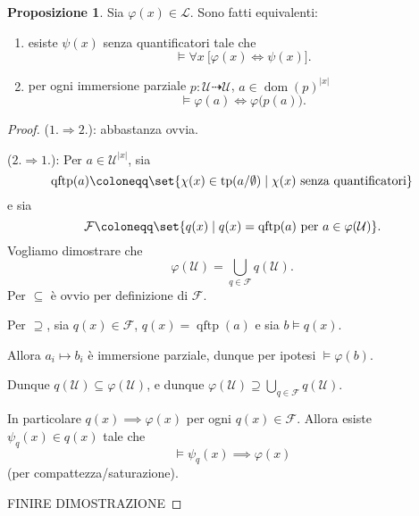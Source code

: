 \documentclass[10pt]{article}
\newcommand{\1}{\mathds{1}}
\newcommand{\partialto}{\dashrightarrow}
\theoremstyle{definition}%
\newtheorem{prop}[thm]{Proposizione}
\theoremstyle{plain}
\theoremstyle{remark}
\begin{document}
\begin{prop}
Sia \(\varphi(x) \in \mathcal{L}\). Sono fatti equivalenti:
\begin{enumerate}
\item esiste \(\psi(x)\) senza quantificatori tale che
\begin{equation*}
 \vDash \forall x\ \big[\varphi(x)\iff\psi(x)\big].
\end{equation*}
\item per ogni immersione parziale \(p:\mathcal{U}\partialto\mathcal{U}\), \(a \in \operatorname{dom}(p)^{|x|}\)
\begin{equation*}
 \vDash \varphi(a)\iff\varphi\big(p(a)\big).
\end{equation*}
\end{enumerate}
\end{prop}
\begin{proof}
(\(1.\Rightarrow 2.\)): abbastanza ovvia.

(\(2.\Rightarrow 1.\)): Per \(a \in \mathcal{U}^{|x|}\), sia
\begin{equation*}
\operatorname{qftp}(a) \coloneqq \set{\chi(x) \in \operatorname{tp}(a/\emptyset)\mid \chi(x)\text{ senza quantificatori}}
\end{equation*}
e sia
\begin{equation*}
\mathcal{F}\coloneqq\set{q(x)\mid q(x)=\operatorname{qftp}(a)\text{ per }a \in \varphi(\mathcal{U})}.
\end{equation*}
Vogliamo dimostrare che
\begin{equation*}
\varphi(\mathcal{U}) = \bigcup_{q \in \mathcal{F}}q(\mathcal{U}).
\end{equation*}
Per \(\subseteq\) è ovvio per definizione di \(\mathcal{F}\).

Per \(\supseteq\), sia \(q(x) \in \mathcal{F}\), \(q(x)=\operatorname{qftp}(a)\) e sia \(b\vDash q(x)\).

Allora \(a_{i}\mapsto b_{i}\) è immersione parziale, dunque per ipotesi \(\vDash \varphi(b)\).

Dunque \(q(\mathcal{U}) \subseteq \varphi(\mathcal{U})\), e dunque \(\varphi(\mathcal{U}) \supseteq \bigcup_{q \in \mathcal{F}}q(\mathcal{U})\).

In particolare \(q(x)\implies \varphi(x)\) per ogni \(q(x) \in \mathcal{F}\). Allora esiste \(\psi_{q}(x) \in q(x)\) tale che
\begin{equation*}
\vDash \psi_{q}(x)\implies\varphi(x)
\end{equation*}
(per compattezza/saturazione).

FINIRE DIMOSTRAZIONE
\end{proof}
\end{document}
